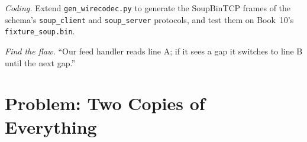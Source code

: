 \begin{exercise}[$\star\star\star$]\label{exo:ll:protocols-ii-binary-exchange-protocols:7}
\emph{Coding.} Extend \texttt{gen\_wirecodec.py} to generate the SoupBinTCP frames of the schema's \texttt{soup\_client} and
\texttt{soup\_server} protocols, and test them on Book~10's \texttt{fixture\_soup.bin}.
\end{exercise}

\begin{exercise}[$\star\star\star$]\label{exo:ll:protocols-ii-binary-exchange-protocols:8}
\emph{Find the flaw.} ``Our feed handler reads line A; if it sees a gap it switches to line B until the next gap.''
\end{exercise}

\section{Problem: Two Copies of Everything}


